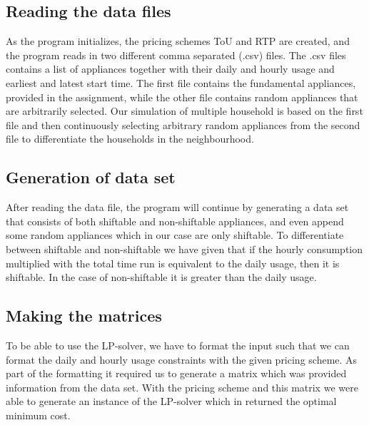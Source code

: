 \documentclass{article}
\begin{document}
	\subsection{Reading the data files }
	As the program initializes, the pricing schemes ToU and RTP are created, and the program reads in two different comma separated (.csv) files. The .csv files contains a list of appliances together with their daily and hourly usage and earliest and latest start time. The first file contains the fundamental appliances, provided in the assignment, while the other file contains random appliances that are arbitrarily selected. Our simulation of multiple household is based on the first file and then continuously selecting arbitrary random appliances from the second file to differentiate the households in the neighbourhood.


	\subsection{Generation of data set}
	After reading the data file, the program will continue by generating a data set that consists of both shiftable and non-shiftable appliances, and even append some random appliances which in our case are only shiftable. To differentiate between shiftable and non-shiftable we have given that if the hourly consumption multiplied with the total time run is equivalent to the daily usage, then it is shiftable. In the case of non-shiftable it is greater than the daily usage.


	\subsection{Making the matrices}
	To be able to use the LP-solver, we have to format the input such that we can format the daily and hourly usage constraints with the given pricing scheme. As part of the formatting it required us to generate a matrix which was provided information from the data set. With the pricing scheme and this matrix we were able to generate an instance of the LP-solver which in returned the optimal minimum cost.
\end{document}
